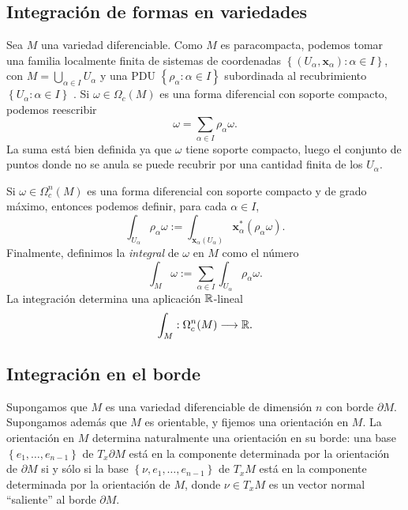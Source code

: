 \documentclass[11pt,a4paper]{amsbook}
\theoremstyle{remark} \newtheorem{rmk}[subsection]{Observación}
\theoremstyle{definition} \newtheorem{defn}[subsection]{Definición}
\theoremstyle{definition} \newtheorem{ex}[subsection]{Ejemplo}
\theoremstyle{definition} \newtheorem{ej}[subsection]{Ejercicio}
\begin{document}
\subsection{Integración de formas en variedades}
Sea $M$ una variedad diferenciable. Como $M$ es paracompacta, podemos tomar una familia localmente finita de sistemas de coordenadas $\left\{ (U_\alpha,\bm{x}_\alpha) : \alpha \in I \right\}$, con $M=\bigcup_{\alpha \in I} U_\alpha$ y una PDU $\left\{ \rho_\alpha:\alpha\in I \right\}$ subordinada al recubrimiento $\left\{ U_\alpha: \alpha \in I \right\}$ . Si $\omega \in \Omega_c(M)$ es una forma diferencial con soporte compacto, podemos reescribir
\begin{equation*}
\omega = \sum_{\alpha \in I} \rho_\alpha \omega.
\end{equation*}
La suma está bien definida ya que $\omega$ tiene soporte compacto, luego el conjunto de puntos donde no se anula se puede recubrir por una cantidad finita de los $U_\alpha$.

Si $\omega \in \Omega_c^n(M)$ es una forma diferencial con soporte compacto y de grado máximo, entonces podemos definir, para cada $\alpha \in I$,
\begin{equation*}
\int_{U_\alpha} \rho_\alpha \omega := \int_{\bm{x}_\alpha(U_\alpha)}\bm{x}_{\alpha}^*(\rho_\alpha \omega).
\end{equation*}
Finalmente, definimos la \emph{integral} de $\omega$ en $M$ como el número
\begin{equation*}
\int_M \omega := \sum_{\alpha \in I} \int_{U_\alpha} \rho_\alpha \omega.
\end{equation*}
La integración determina una aplicación $\mathbb R$-lineal
\begin{equation*}
\int_M: \Omega^n_c(M) \longrightarrow \mathbb R.
\end{equation*}

\subsection{Integración en el borde} Supongamos que $M$ es una variedad diferenciable de dimensión $n$ con borde $\partial M$. Supongamos además que $M$ es orientable, y fijemos una orientación en $M$. La orientación en $M$ determina naturalmente una orientación en su borde: una base $\left\{ e_1,\dots, e_{n-1}\right\}$ de $T_x\partial M$ está en la componente determinada por la orientación de $\partial M$ si y sólo si la base $\left\{ \nu, e_1,\dots,e_{n-1} \right\}$ de $T_xM$ está en la componente determinada por la orientación de $M$, donde $\nu \in T_xM$ es un vector normal ``saliente'' al borde $\partial M$.
\end{document}
